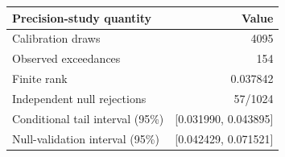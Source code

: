 \begin{tabular}{lr}\toprule Precision-study quantity & Value\\\midrule
Calibration draws & 4095\\
Observed exceedances & 154\\
Finite rank & 0.037842\\
Independent null rejections & 57/1024\\
Conditional tail interval (95\%) & [0.031990, 0.043895]\\
Null-validation interval (95\%) & [0.042429, 0.071521]\\
\bottomrule\end{tabular}
